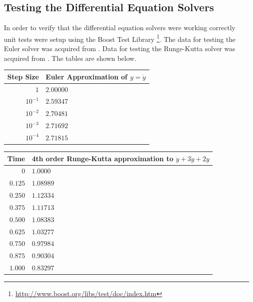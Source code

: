 \subsection{Testing the Differential Equation Solvers}
In order to verify that the differential equation solvers were working correctly
unit tests were setup using the Boost Test Library
\footnote{\url{http://www.boost.org/libs/test/doc/index.htm}}. The data for
testing the Euler solver was acquired from \cite[p. 120]{NagleSaff}. Data for
testing the Runge-Kutta solver was acquired from \cite[p. 135, p.
278]{NagleSaff}. The tables are shown below.
\newline
\newline
\begin{tabular}{|r|l|}
	\hline
	Step Size & Euler Approximation of $y = \dot{y}$\\
	\hline
	$1$ & $2.00000$ \\
	$10^{-1}$ & $2.59347$ \\
	$10^{-2}$ & $2.70481$ \\
	$10^{-3}$ & $2.71692$ \\
	$10^{-4}$ & $2.71815$ \\
	\hline
\end{tabular}
\newline
\newline
\begin{tabular}{|r|l|}
	\hline
	Time & 4th order Runge-Kutta approximation to $\ddot{y} + 3\dot{y} + 2y$\\
	\hline
	$0$ & $1.0000$ \\
	$0.125$ & $1.08989$ \\
	$0.250$ & $1.12334$ \\
	$0.375$ & $1.11713$ \\
	$0.500$ & $1.08383$ \\
	$0.625$ & $1.03277$ \\
	$0.750$ & $0.97984$ \\
	$0.875$ & $0.90304$ \\
	$1.000$ & $0.83297$ \\
	\hline
\end{tabular}

